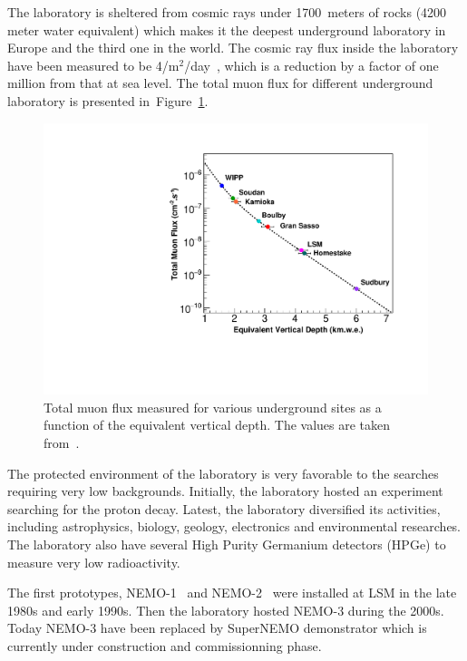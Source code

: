 \documentclass[main.tex]{subfiles}
\begin{document}
\NI The laboratory is sheltered from cosmic rays under 1700~meters of rocks (4200 meter water equivalent) which makes it the deepest underground laboratory in Europe and the third one in the world. The cosmic ray flux inside the laboratory have been measured to be 4/m$^\text{2}$/day~\cite{CosmicFluxLSM}, which is a reduction by a factor of one million from that at sea level. The total muon flux for different underground laboratory is presented in~Figure~\ref{LabDeepth}.
 

\begin{figure}[h!]
\begin{center}
\includegraphics[scale=0.60]{pictures/Chap3/MuonFluxDifferentLab.pdf}
\caption{Total muon flux measured for various underground sites as a function of the equivalent vertical depth. The values are  taken from~\cite{MuonFluxUndergroundLab}. }
\label{LabDeepth}
\end{center}
\end{figure}


\NI The protected environment of the laboratory is very favorable to the searches requiring very low backgrounds. Initially, the laboratory hosted an experiment searching for the proton decay. Latest, the laboratory diversified its activities, including astrophysics, biology, geology, electronics and environmental researches. The laboratory also have several High Purity Germanium detectors (HPGe) to measure very low radioactivity. 


\bigskip


\NI The first prototypes, NEMO-1~\cite{NEMO1} and NEMO-2~\cite{NEMO2} were installed at LSM in the late 1980s and early 1990s. Then the laboratory hosted NEMO-3 during the 2000s. Today NEMO-3 have been replaced by SuperNEMO demonstrator which is currently under construction and commissionning phase.
\end{document}
